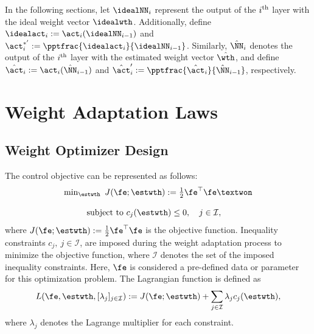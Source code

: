 \documentclass[final,5p,times,twocolumn,authoryear]{elsarticle}
\begin{document}
In the following sections, let $\idealNN_i$ represent the output of the $i\textsuperscript{th}$ layer with the ideal weight vector $\idealwth$. 
Additionally, define $\idealact_i:=\act_i(\idealNN_{i-1})$ and $\act^{*'}_i:= \pptfrac{\idealact_i}{\idealNN_{i-1}}$. 
Similarly, $\hat\NN_i$ denotes the output of the $i\textsuperscript{th}$ layer with the estimated weight vector $\hat \wth$, and define $\hat\act_i:=\act_i(\hat\NN_{i-1})$ and $\hat\act_i':= \pptfrac{\hat\act_i}{\hat\NN_{i-1}}$, respectively.

\section{Weight Adaptation Laws}\label{sec:adap_laws}

\subsection{Weight Optimizer Design}\label{sec:sub:weight optimizer}

The control objective can be represented as follows:
\begin{equation}
    \begin{matrix}
        \min_{\estwth} \ J(\fe;\estwth):= 
        \tfrac{1}{2} \fe^\top \fe₩
        \\ \\
        \begin{aligned}
        \text{subject to }&c_{j}(\estwth) 
        \le0, \quad j\in\mathcal{I},
        \end{aligned}
    \end{matrix}
    \label{eq:opt:problem1}
\end{equation}
where $J(\fe;\estwth):= \tfrac{1}{2} \fe^\top \fe$ is the objective function.
Inequality constraints $c_j,\ j\in\mathcal{I}$, are imposed during the weight adaptation process to minimize the objective function, where $\mathcal I$ denotes the set of the imposed inequality constraints. 
Here, $\fe$ is considered a pre-defined data or parameter for this optimization problem. The Lagrangian function is defined as
\begin{equation}
    L(
        \fe,\estwth,[\lambda_j]_{j\in\mathcal I}
    ) 
    := 
    J(\fe;\estwth) 
    + 
    \sum_{j\in\mathcal I}
    \lambda_{j}
    c_{j}(\estwth)
    ,
    \label{eq:lagrangian}
\end{equation}
where $\lambda_j$ denotes the Lagrange multiplier for each constraint.
\end{document}

